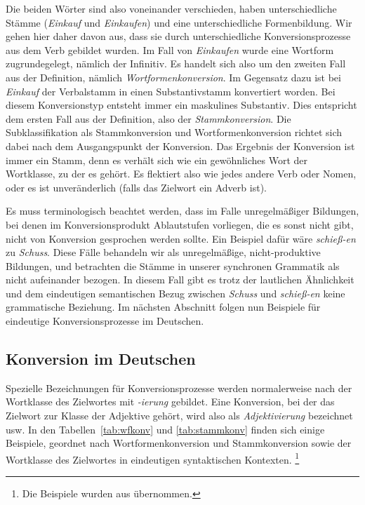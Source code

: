
Die beiden Wörter sind also voneinander verschieden, haben unterschiedliche Stämme (\textit{Einkauf} und \textit{Einkaufen}) und eine unterschiedliche Formenbildung.
Wir gehen hier daher davon aus, dass sie durch unterschiedliche Konversionsprozesse aus dem Verb gebildet wurden.
Im Fall von \textit{Einkaufen} wurde eine Wortform zugrundegelegt, nämlich der Infinitiv.
Es handelt sich also um den zweiten Fall aus der Definition, nämlich \textit{Wortformenkonversion}.
Im Gegensatz dazu ist bei \textit{Einkauf} der Verbalstamm in einen Substantivstamm konvertiert worden.
Bei diesem Konversionstyp entsteht immer ein maskulines Substantiv.
Dies entspricht dem ersten Fall aus der Definition, also der \textit{Stammkonversion}.
Die Subklassifikation als Stammkonversion und Wortformenkonversion richtet sich dabei nach dem Ausgangspunkt der Konversion.
Das Ergebnis der Konversion ist immer ein Stamm, denn es verhält sich wie ein gewöhnliches Wort der Wortklasse, zu der es gehört.
Es flektiert also wie jedes andere Verb oder Nomen, oder es ist unveränderlich (falls das Zielwort \zB ein Adverb ist).

Es muss terminologisch beachtet werden, dass im Falle unregelmäßiger Bildungen, bei denen \zB im Konversionsprodukt Ablautstufen vorliegen, die es sonst nicht gibt, nicht von Konversion gesprochen werden sollte.
Ein Beispiel dafür wäre \textit{schieß-en} zu \textit{Schuss}.
Diese Fälle behandeln wir als unregelmäßige, nicht-pro\-duk\-ti\-ve Bildungen, und betrachten die Stämme in unserer synchronen Grammatik als nicht aufeinander bezogen.
In diesem Fall gibt es trotz der lautlichen Ähnlichkeit und dem eindeutigen semantischen Bezug zwischen \textit{Schuss} und \textit{schieß-en} keine grammatische Beziehung.
Im nächsten Abschnitt folgen nun Beispiele für eindeutige Konversionsprozesse im Deutschen.

\subsection{Konversion im Deutschen}

\label{sec:konvdeutsch}

Spezielle Bezeichnungen für Konversionsprozesse werden normalerweise nach der Wortklasse des Zielwortes mit \textit{-ierung} gebildet.
Eine Konversion, bei der das Zielwort zur Klasse der Adjektive gehört, wird also \zB als \textit{Adjektivierung} bezeichnet usw.
In den Tabellen~\ref{tab:wfkonv} und \ref{tab:stammkonv} finden sich einige Beispiele, geordnet nach Wortformenkonversion und Stammkonversion sowie der Wortklasse des Zielwortes in eindeutigen syntaktischen Kontexten.%
\footnote{Die Beispiele wurden aus \citealp[280]{Eisenberg1} übernommen.}

